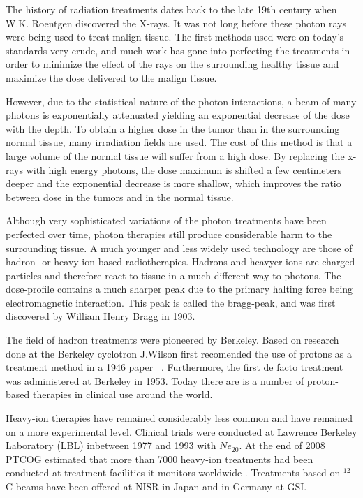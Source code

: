 The history of radiation treatments dates back to the late 19th century when W.K. Roentgen discovered the X-rays. It was not long before these photon rays were being used to treat malign tissue. The first methods used were on today's standards very crude, and much work has gone into perfecting the treatments in order to minimize the effect of the rays on the surrounding healthy tissue and maximize the dose delivered to the malign tissue.

However, due to the statistical nature of the photon interactions, a beam of many photons is
exponentially attenuated yielding an exponential decrease of the dose with the depth. To
obtain a higher dose in the tumor than in the surrounding normal tissue, many irradiation
fields are used. The cost of this method is that a large volume of the normal tissue
will suffer from a high dose. By replacing the x-rays with high energy photons, the dose
maximum is shifted a few centimeters deeper and the exponential decrease is more shallow,
which improves the ratio between dose in the tumors and in the normal tissue.

Although very sophisticated variations of the photon treatments have been perfected over time, photon therapies still produce considerable harm to the surrounding tissue. A much younger and less widely used technology are those of hadron- or heavy-ion based radiotherapies. Hadrons and heavyer-ions are charged particles and therefore react to tissue in a much different way to photons. The dose-profile contains a much sharper peak due to the primary halting force being electromagnetic interaction. This peak is called the bragg-peak, and was first discovered by William Henry Bragg in 1903.

The field of hadron treatments were pioneered by Berkeley. Based on research done at the Berkeley cyclotron J.Wilson first recomended the use of protons as a treatment method in a 1946 paper ~\cite{RW46}. Furthermore, the first de facto treatment was administered at Berkeley in 1953. Today there are is a number of proton-based therapies in clinical use around the world.

Heavy-ion therapies have remained considerably less common and have remained on a more experimental level. Clinical trials were conducted at Lawrence Berkeley Laboratory (LBL) inbetween 1977 and 1993 with $Ne_20$. At the end of 2008 PTCOG estimated that more than 7000 heavy-ion treatments had been conducted at treatment facilities it monitors worldwide . Treatments based on $^{12}$C beams have been offered at NISR in Japan and in Germany at GSI.~\cite{PTCOGstat}

